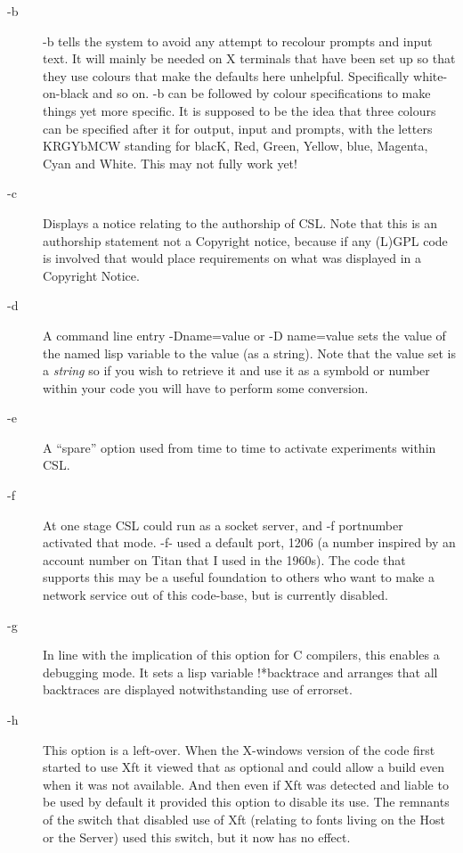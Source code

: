 \documentclass[a4paper,11pt]{article}
\begin{document}
\begin{description}
\item [{\ttfamily -b}]
{\ttfamily -b} tells the system to avoid any attempt to recolour prompts
and input text. It will mainly be needed on X terminals that have been
set up so that they use colours that make the defaults here unhelpful.
Specifically white-on-black and so on.
{\ttfamily -b} can be followed by colour specifications to make things yet
more specific. It is supposed to be the idea that three colours can be
specified after it for output, input and prompts, with the letters KRGYbMCW
standing for blacK, Red, Green, Yellow, blue, Magenta, Cyan and White.
This may not fully work yet!

\item [{\ttfamily -c}]
Displays a notice relating to the authorship of CSL. Note that this
is an authorship statement not a Copyright notice, because if any
(L)GPL code is involved that would place requirements on what was
displayed in a Copyright Notice.

\item [{\ttfamily -d}]
A command line entry {\ttfamily -Dname=value} or {\ttfamily -D name=value}
sets the value of the named lisp variable to the value (as a string).
Note that the value set is a {\em string} so if you wish to retrieve
it and use it as a symbold or number within your code you will have to
perform some conversion.

\item [{\ttfamily -e}]
A ``spare'' option used from time to time to activate experiments within
CSL.

\item [{\ttfamily -f}]
At one stage CSL could run as a socket server, and {\ttfamily -f portnumber}
activated that mode. {\ttfamily -f-} used a default port, 1206 (a number
inspired by an account number on Titan that I used in the 1960s). The code
that supports this may be a useful foundation to others who want to make a
network service out of this code-base, but is currently disabled.

\item [{\ttfamily -g}]
In line with the implication of this option for C compilers, this enables
a debugging mode. It sets a lisp variable {\ttfamily !*backtrace} and
arranges that all backtraces are displayed notwithstanding use of
{\ttfamily errorset}.

\item [{\ttfamily -h}]
This option is a left-over. When the X-windows version of the code first
started to use Xft it viewed that as optional and could allow a build even when
it was not available. And then even if Xft was detected and liable to be used
by default it provided this option to disable its use. The remnants of the
switch that disabled use of Xft (relating to fonts living on the Host or
the Server) used this switch, but it now has no effect.


\end{description}
\end{document}
